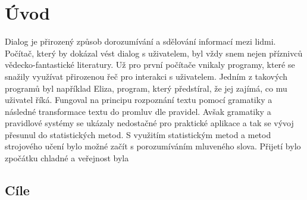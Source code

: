 \chapter*{Úvod}

Dialog je přirozený způsob dorozumívání a sdělování informací mezi lidmi.
Počítač, který by dokázal vést dialog s uživatelem, byl vždy snem nejen
příznivců vědecko-fantastické literatury.
Už pro první počítače vnikaly programy, které se snažily využívat přirozenou
řeč pro interakci s uživatelem.
Jedním z takových programů byl například Eliza, program, který předstíral, že
jej zajímá, co mu uživatel říká.
Fungoval na principu rozpoznání textu pomocí gramatiky a následné transformace
textu do promluv dle pravidel.
Avšak gramatiky a pravidlové systémy se ukázaly nedostačné pro praktické
aplikace a tak se vývoj přesunul do statistických metod.
S využitím statistickým metod a metod strojového učení bylo možné začít s
porozumíváním mluveného slova.
Přijetí bylo zpočátku chladné a veřejnost byla 

\section{Cíle}

